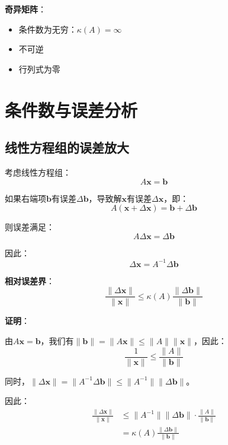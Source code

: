 \documentclass[12pt,a4paper]{article}
\begin{document}
\textbf{奇异矩阵}：
\begin{itemize}
\item 条件数为无穷：$\kappa(A) = \infty$
\item 不可逆
\item 行列式为零
\end{itemize}

\section{条件数与误差分析}

\subsection{线性方程组的误差放大}

考虑线性方程组：
\begin{equation}
A\bm{x} = \bm{b}
\label{eq:linear_system}
\end{equation}

如果右端项$\bm{b}$有误差$\Delta \bm{b}$，导致解$\bm{x}$有误差$\Delta \bm{x}$，即：
\begin{equation}
A(\bm{x} + \Delta \bm{x}) = \bm{b} + \Delta \bm{b}
\end{equation}

则误差满足：
\begin{equation}
A \Delta \bm{x} = \Delta \bm{b}
\end{equation}

因此：
\begin{equation}
\Delta \bm{x} = A^{-1} \Delta \bm{b}
\end{equation}

\textbf{相对误差界}：
\begin{equation}
\frac{\|\Delta \bm{x}\|}{\|\bm{x}\|} \leq \kappa(A) \frac{\|\Delta \bm{b}\|}{\|\bm{b}\|}
\label{eq:error_bound}
\end{equation}

\textbf{证明}：

由$A\bm{x} = \bm{b}$，我们有$\|\bm{b}\| = \|A\bm{x}\| \leq \|A\| \|\bm{x}\|$，因此：
\begin{equation}
\frac{1}{\|\bm{x}\|} \leq \frac{\|A\|}{\|\bm{b}\|}
\end{equation}

同时，$\|\Delta \bm{x}\| = \|A^{-1} \Delta \bm{b}\| \leq \|A^{-1}\| \|\Delta \bm{b}\|$。

因此：
\begin{align}
\frac{\|\Delta \bm{x}\|}{\|\bm{x}\|} &\leq \|A^{-1}\| \|\Delta \bm{b}\| \cdot \frac{\|A\|}{\|\bm{b}\|} \\
&= \kappa(A) \frac{\|\Delta \bm{b}\|}{\|\bm{b}\|}
\end{align}
\end{document}
